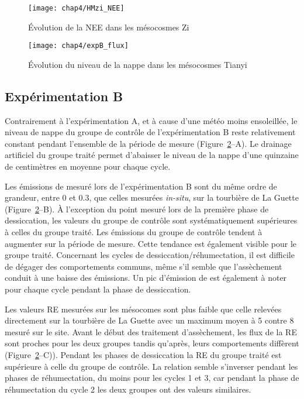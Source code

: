 \begin{figure}
\centering
\texttt{[image: chap4/HMzi\_NEE]}
\caption{Évolution de la NEE dans les mésocosmes Zi}
\label{fig:HMzi_NEE}
\end{figure}


\begin{figure}
\centering
\texttt{[image: chap4/expB\_flux]}
\caption{Évolution du niveau de la nappe dans les mésocosmes Tianyi}
\label{fig:HMty}
\end{figure}

\subsection{Expérimentation B}

Contrairement à l'expérimentation A, et à cause d'une météo moins ensoleillée, le niveau de nappe du groupe de contrôle de l'expérimentation B reste relativement constant pendant l'ensemble de la période de mesure (Figure~\ref{fig:HMty}--A).
Le drainage artificiel du groupe traité permet d'abaisser le niveau de la nappe d'une quinzaine de centimètres en moyenne pour chaque cycle.

Les émissions de \chh mesuré lors de l'expérimentation B sont du même ordre de grandeur, entre 0 et \SI{0.3}{\uml}, que celles mesurées \textit{in-situ}, sur la tourbière de La Guette (Figure~\ref{fig:HMty}--B).
À l'exception du point mesuré lors de la première phase de dessiccation, les valeurs du groupe de contrôle sont systématiquement supérieures à celles du groupe traité.
Les émissions du groupe de contrôle tendent à augmenter sur la période de mesure.
Cette tendance est également visible pour le groupe traité.
Concernant les cycles de dessiccation/réhumectation, il est difficile de dégager des comportements communs, même s'il semble que l'assèchement conduit à une baisse des émissions.
Un pic d'émission de \chh est également à noter pour chaque cycle pendant la phase de dessiccation.

Les valeurs RE mesurées sur les mésocomes sont plus faible que celle relevées directement sur la tourbière de La Guette avec un maximum moyen à 5 contre \SI{8}{\uml} mesuré sur le site.
Avant le début des traitement d'assèchement, les flux de la RE sont proches pour les deux groupes tandis qu'après, leurs comportements diffèrent (Figure~\ref{fig:HMty}--C)).
Pendant les phases de dessiccation la RE du groupe traité est supérieure à celle du groupe de contrôle.
La relation semble s'inverser pendant les phases de réhumectation, du moins pour les cycles 1 et 3, car pendant la phase de réhumectation du cycle 2 les deux groupes ont des valeurs similaires.


